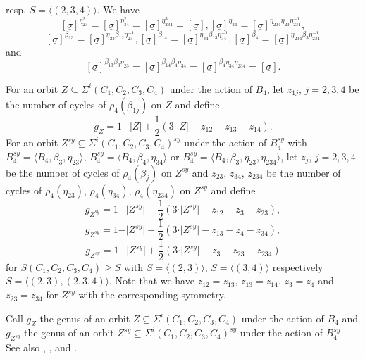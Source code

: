 \documentclass[12pt,a4paper]{article}
\numberwithin{equation}{section}
\numberwithin{table}{section}
\begin{document}
resp. $S = \langle (2,3,4) \rangle$.
We have
$$[\underline{\sigma}]^{\eta^2_{23}} = [\underline{\sigma}]^{\eta^2_{34}} = [\underline{\sigma}]^{\eta^3_{234}} = [\underline{\sigma}],
[\underline{\sigma}]^{\eta_{34}} = [\underline{\sigma}]^{\eta_{234} \eta_{23} \eta^{-1}_{234}},$$
$$[\underline{\sigma}]^{\beta_{13}} = [\underline{\sigma}]^{\eta_{23} \beta_{12} \eta^{-1}_{23}},
[\underline{\sigma}]^{\beta_{14}} = [\underline{\sigma}]^{\eta_{34} \beta_{13} \eta^{-1}_{34}},
[\underline{\sigma}]^{\beta_4} = [\underline{\sigma}]^{\eta_{234} \beta_3 \eta^{-1}_{234}}$$
and
$$[\underline{\sigma}]^{\beta_{13} \beta_3 \eta_{23}} =
[\underline{\sigma}]^{\beta_{14} \beta_4 \eta_{34}} =
[\underline{\sigma}]^{\beta_4 \eta_{34} \eta_{234}} = [\underline{\sigma}].$$
\par
\noindent
For an orbit $Z \subseteq \Sigma^i(C_1,C_2,C_3,C_4)$ under the action of $B_4$, let $z_{1j}$, $j=2,3,4$ be the number
of cycles of $\rho_4(\beta_{1j})$ on $Z$ and define
$$g_Z = 1 -  \vert Z \vert  + \frac{1}{2}(3\cdot  \vert Z \vert  - z_{12} - z_{13} - z_{14}).$$
For an orbit $Z^{sy} \subseteq \Sigma^i(C_1,C_2,C_3,C_4)^{sy}$ under the action of $B^{sy}_4$ with
$B^{sy}_4 = \langle B_4, \beta_3, \eta_{23} \rangle$, $B^{sy}_4 = \langle B_4, \beta_4, \eta_{34} \rangle$ or
$B^{sy}_4 = \langle B_4, \beta_3, \eta_{23}, \eta_{234} \rangle$,
let $z_j$, $j=2,3,4$ be the number of cycles of $\rho_4(\beta_{j})$ on $Z^{sy}$ and $z_{23}$, $z_{34}$,
$z_{234}$ be the number of cycles of $\rho_4(\eta_{23})$, $\rho_4(\eta_{34})$, $\rho_4(\eta_{234})$ on $Z^{sy}$
and define
$$g_{Z^{sy}} = 1 -  \vert Z^{sy} \vert  + \frac{1}{2}(3\cdot  \vert Z^{sy} \vert  - z_{12} - z_{3} - z_{23}),$$
$$g_{Z^{sy}} = 1 -  \vert Z^{sy} \vert  + \frac{1}{2}(3\cdot  \vert Z^{sy} \vert  - z_{13} - z_{4} - z_{34}),$$
$$g_{Z^{sy}} = 1 -  \vert Z^{sy} \vert  + \frac{1}{2}(3\cdot  \vert Z^{sy} \vert  - z_{3} - z_{23} - z_{234})$$
for $S(C_1,C_2,C_3,C_4) \geq S$ with $S = \langle (2,3) \rangle$, $S = \langle (3,4) \rangle$
respectively $S = \langle (2,3), (2,3,4) \rangle$.
Note that we have $z_{12}=z_{13}$, $z_{13}=z_{14}$, $z_3=z_4$ and $z_{23} = z_{34}$ for $Z^{sy}$ with the corresponding symmetry.
\par
\noindent
Call $g_Z$ the genus of an orbit $Z \subseteq \Sigma^i(C_1,C_2,C_3,C_4)$ under the action of $B_4$ and $g_{Z^{sy}}$
the genus of an orbit $Z^{sy} \subseteq \Sigma^i(C_1,C_2,C_3,C_4)^{sy}$ under the action of $B^{sy}_4$.
See also \cite[Definition 5.3]{RefMat1991}, \cite[Satz 7.2]{RefMat1991},
\cite[III, 5.2]{RefMM2018} and \cite[III, Theorem 7.8]{RefMM2018}. 
\end{document}
